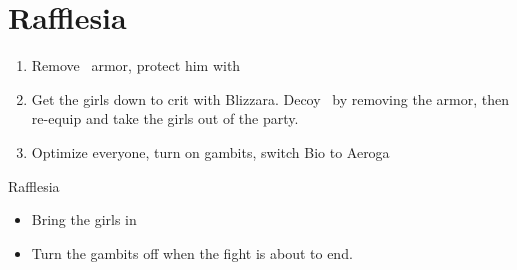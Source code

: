 \chapter{Rafflesia}

\begin{enumerate}
\item Remove \vaan\ armor, protect him with \penelo
\item Get the girls down to crit with Blizzara. Decoy \vaan\ by removing the armor, then re-equip and take the girls out of the party.
\item Optimize everyone, turn on gambits, switch Bio to Aeroga
\end{enumerate}
\begin{battle}{Rafflesia}
\begin{itemize}
\vaanf Run up
\item Bring the girls in
\item Turn the gambits off when the fight is about to end.
\end{itemize}
\end{battle}